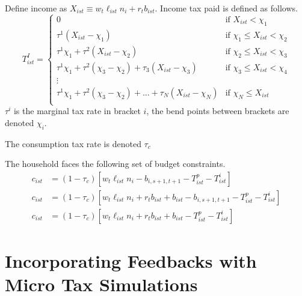 \documentclass[letterpaper,12pt]{article}
\theoremstyle{definition}
\numberwithin{equation}{section}
\begin{document}
\begin{spacing}{1.5}
    Define income as $X_{ist} \equiv w_t \ell_{ist} n_i + r_t b_{ist}$.  Income tax paid is defined as follows.
    \begin{equation}
    T^I_{ist} = \left\{ \begin{matrix} 0 & \text{if } X_{ist} < \chi_1 \\
                \tau^1 (X_{ist} - \chi_1) & \text{if }  \chi_1 \le X_{ist} < \chi_2 \\
                \tau^1 \chi_1 + \tau^2 (X_{ist} - \chi_2) & \text{if }  \chi_2 \le X_{ist} < \chi_3 \\
                \tau^1 \chi_1 + \tau^2 (\chi_3 - \chi_2) + \tau_3 (X_{ist} - \chi_3) & \text{if }  \chi_3 \le X_{ist} < \chi_4 \\
                \vdots \\
                \tau^1 \chi_1 + \tau^2 (\chi_3 - \chi_2) +\dots+ \tau_N (X_{ist} - \chi_N) & \text{if }  \chi_N \le X_{ist} \\
                \end{matrix} \right.
    \end{equation}
    $\tau^i$ is the marginal tax rate in bracket $i$, the bend points between brackets are denoted $\chi_i$.

    The consumption tax rate is denoted $\tau_c$

    The household faces the following set of budget constraints.
    \begin{align}
    c_{ist} & = (1-\tau_c)\left[w_t \ell_{ist} n_i - b_{i,s+1,t+1} - T^p_{ist} - T^i_{ist} \right] \\
    c_{ist} & = (1-\tau_c)\left[w_t \ell_{ist} n_i + r_t b_{ist} + b_{ist} - b_{i,s+1,t+1} - T^p_{ist} - T^i_{ist} \right] \\
    c_{ist} & = (1-\tau_c)\left[w_t \ell_{ist} n_i + r_t b_{ist} + b_{ist} - T^p_{ist} - T^i_{ist} \right] 
    \end{align}

\section{Incorporating Feedbacks with Micro Tax Simulations}\label{SecMicro}


\end{spacing}
\end{document}
